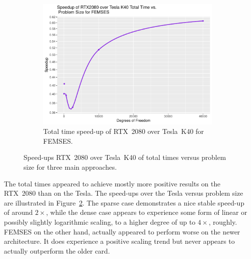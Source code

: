 \begin{figure}
\begin{subfigure}{0.48\linewidth}
		\centering
		\includegraphics[width=\linewidth]{Plots/total_femses_rtx_speedup_vs_n}
		\caption{Total time speed-up of RTX~2080 over Tesla~K40 for FEMSES.}
		\label{fig:total_rtx_femses}
	\end{subfigure}
	\caption{Speed-ups RTX~2080 over Tesla~K40 of total times versus problem size for three main approaches.}
	\label{fig:total_rtx}
\end{figure}

The total times appeared to achieve mostly more positive results on the RTX~2080 than on the Tesla. The speed-ups over the Tesla versus problem size are illustrated in Figure~\ref{fig:total_rtx}. The sparse case demonstrates a nice stable speed-up of around $2\times$, while the dense case appears to experience some form of linear or possibly slightly logarithmic scaling, to a higher degree of up to $4\times$, roughly. FEMSES on the other hand, actually appeared to perform worse on the newer architecture. It does experience a positive scaling trend but never appears to actually outperform the older card.

